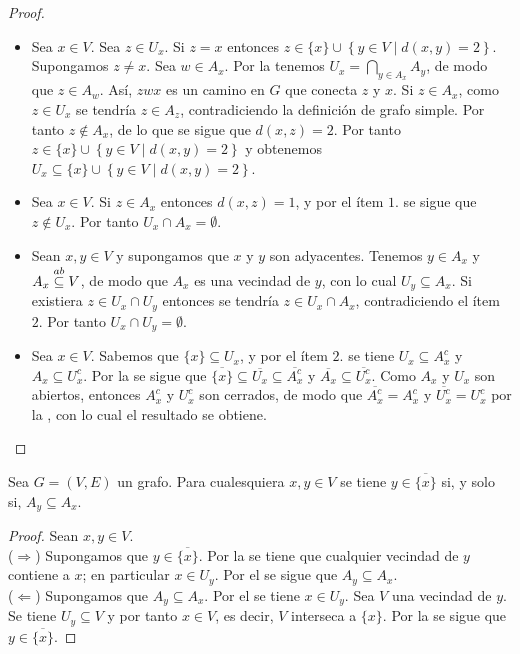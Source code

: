 \begin{proof}
   \phantom{o}
   \begin{itemize}
      \item[1.] Sea $x\in V$. Sea $z\in U_x$. Si $z=x$ entonces $z\in \{x\}\cup \left\lbrace y\in V\mid d(x,y)=2\right\rbrace$. Supongamos $z\ne x$. Sea $w\in A_x$. Por la  tenemos $U_x=\bigcap_{y\in A_x}A_y$, de modo que $z\in A_w$. Así, $zwx$ es un camino en $G$ que conecta $z$ y $x$. Si $z\in A_x$, como $z\in U_x$ se tendría $z\in A_z$, contradiciendo la definición de grafo simple. Por tanto $z\notin A_x$, de lo que se sigue que $d(x,z)=2$. Por tanto $z\in \{x\}\cup \left\lbrace y\in V\mid d(x,y)=2\right\rbrace$ y obtenemos $U_x\subseteq \{x\}\cup \left\lbrace y\in V\mid d(x,y)=2\right\rbrace$.
      \item[2.] Sea $x\in V$. Si $z\in A_x$ entonces $d(x,z)=1$, y por el ítem $1.$ se sigue que $z\notin U_x$. Por tanto $U_x\cap A_x=\emptyset$.
      \item[3.] Sean $x,y\in V$ y supongamos que $x$ y $y$ son adyacentes. Tenemos $y\in A_x$ y $A_x\stackrel{ab}{\subseteq} V$, de modo que $A_x$ es una vecindad de $y$, con lo cual $U_y\subseteq A_x$. Si existiera $z\in U_x\cap U_y$ entonces se tendría $z\in U_x\cap A_x$, contradiciendo el ítem $2.$ Por tanto $U_x\cap U_y=\emptyset$.
      \item[4.] Sea $x\in V$. Sabemos que $\{x\}\subseteq U_x$, y por el ítem $2.$ se tiene $U_x\subseteq A_x^c$ y $A_x\subseteq U_x^c$. Por la  se sigue que $\overline{\{x\}}\subseteq \overline{U_x}\subseteq \overline{A_x^c}$ y $\overline{A_x}\subseteq \overline{U_x^c}$. Como $A_x$ y $U_x$ son abiertos, entonces $A_x^c$ y $U_x^c$ son cerrados, de modo que $\overline{A_x^c}=A_x^c$ y $\overline{U_x^c}=U_x^c$ por la , con lo cual el resultado se obtiene.
   \end{itemize}
\end{proof}
\begin{Cor}\label{Cor:Clausura_unitario}
   Sea $G=(V,E)$ un grafo. Para cualesquiera $x,y\in V$ se tiene $y\in\overline{\{x\}}$ si, y solo si, $A_y\subseteq A_x$. 
\end{Cor}
\begin{proof}
   Sean $x,y\in V$.\\
   ($\Rightarrow$) Supongamos que $y\in\overline{\{x\}}$. Por la  se tiene que cualquier vecindad de $y$ contiene a $x$; en particular $x\in U_y$. Por el  se sigue que $A_y\subseteq A_x$.\\
   ($\Leftarrow$) Supongamos que $A_y\subseteq A_x$. Por el  se tiene $x\in U_y$. Sea $V$ una vecindad de $y$. Se tiene $U_y\subseteq V$ y por tanto $x\in V$, es decir, $V$ interseca a $\{x\}$. Por la  se sigue que $y\in\overline{\{x\}}$.
\end{proof}
